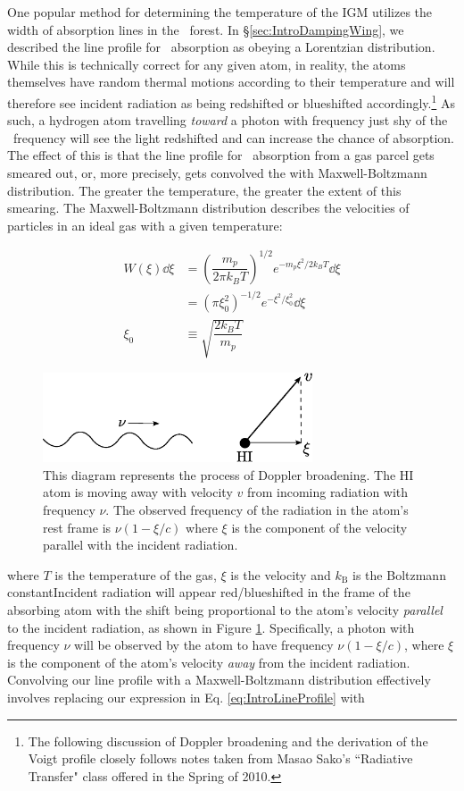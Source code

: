 One popular method for determining the temperature of the IGM utilizes the width of absorption lines in the \lya\ forest. In \S \ref{sec:IntroDampingWing}, we described the line profile for \lya\ absorption as obeying a Lorentzian distribution. While this is technically correct for any given atom, in reality, the atoms themselves have random thermal motions according to their temperature and will therefore see incident radiation as being redshifted or blueshifted accordingly.\footnote{The following discussion of Doppler broadening and the derivation of the Voigt profile closely follows notes taken from Masao Sako's ``Radiative Transfer" class offered in the Spring of 2010.}  As such, a hydrogen atom travelling \textit{toward} a photon with frequency just shy of the \lya\ frequency will see the light redshifted and can increase the chance of absorption. The effect of this is that the line profile for \lya\ absorption from a gas parcel gets smeared out, or, more precisely, gets convolved the with Maxwell-Boltzmann distribution. The greater the temperature, the greater the extent of this smearing. The Maxwell-Boltzmann distribution describes the velocities of particles in an ideal gas with a given temperature:


\begin{align}
W(\xi)\dd \xi &= \left( \dfrac{m_p}{2\pi k_{B}T} \right)^{1/2}e^{-m_p\xi^2/2 k_B T}\dd \xi \\
&= \left(\pi \xi_{0}^{2} \right)^{-1/2} e^{-\xi^{2}/\xi_{0}^{2}} \dd \xi \\
\xi_{0} &\equiv \sqrt{ \dfrac{2k_B T}{m_p}}
\end{align}


\begin{figure}[h]
  \centering
  \includegraphics[width=8cm]{dopplerDiagram.eps}
  \caption{This diagram represents the process of Doppler broadening. The HI atom is moving away with velocity $v$ from incoming radiation with frequency $\nu$. The observed frequency of the radiation in the atom's rest frame is $\nu(1-\xi/c)$ where $\xi$ is the component of the velocity parallel with the incident radiation. }
  \label{fig:dopplerDiagram}
\end{figure}


where $T$ is the temperature of the gas, $\xi$ is the velocity and $k_{\text{B}}$ is the Boltzmann constantIncident radiation will appear red/blueshifted in the frame of the absorbing atom with the shift being proportional to the atom's velocity \textit{parallel} to the incident radiation, as shown in Figure \ref{fig:dopplerDiagram}. Specifically, a photon with frequency $\nu$ will be observed by the atom to have frequency $\nu(1-\xi/c)$, where $\xi$ is the component of the atom's velocity \textit{away} from the incident radiation. Convolving our line profile with a Maxwell-Boltzmann distribution effectively involves replacing our expression in Eq. \ref{eq:IntroLineProfile} with

